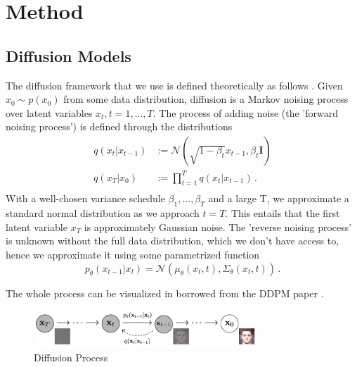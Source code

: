 \section{Method}

\subsection{Diffusion Models}
\label{sec:diffusion_models}
The diffusion framework that we use is defined theoretically as follows \cite{ddpm,improved_diffusion,EDGE}. Given $x_0 \sim p(x_0)$ from some data distribution, diffusion is a Markov noising process over latent variables $x_t, t=1,...,T$. The process of adding noise (the 'forward noising process') is defined through the distributions
\begin{equation}
    \begin{aligned}
        q(x_t|x_{t-1}) &:= \mathcal{N}(\sqrt{1-\beta_t} x_{t-1}, \beta_t \mathbf{I}) \\
        q(x_T | x_0) &:= \prod_{t=1}^T q(x_t | x_{t-1})\,. \\
    \end{aligned}
\end{equation}
With a well-chosen variance schedule $\beta_1, ..., \beta_T$ and a large T, we approximate a standard normal distribution as we approach $t=T$. This entails that the first latent variable $x_T$ is approximately Gaussian noise. The 'reverse noising process' is unknown without the full data distribution, which we don't have access to, hence we approximate it using some parametrized function
\begin{equation}
    \label{eq:reverse_noising_mean_variance}
    p_{\theta}(x_{t-1} | x_t) = \mathcal{N}(\mu_{\theta}(x_t, t), \Sigma_{\theta}(x_t, t))\,.
\end{equation}

The whole process can be visualized in  borrowed from the DDPM paper \cite{ddpm}.

\begin{figure}[!ht]
    \centering
    \includegraphics[width=0.75\textwidth]{Figures/diffusion/diffusion_process.png}
    \caption{Diffusion Process}
    \label{fig:diffusion_process}
\end{figure}

